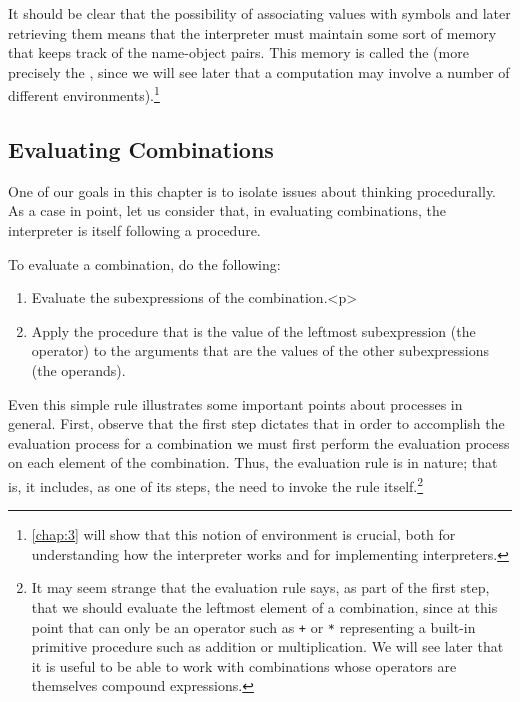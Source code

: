It should be clear that the possibility of associating values with
symbols and later retrieving them means that the interpreter must
maintain some sort of memory that keeps track of the name-object
pairs.  This memory is called the  (more precisely
the , since we will see later that a
computation may involve a number of different environments).\footnote{
  \ref{chap:3} will show that this notion of environment is crucial,
  both for understanding how the interpreter works and for
  implementing interpreters.}

\subsection{Evaluating Combinations}
\label{sec:1.1.3}

One of our goals in this chapter is to isolate issues about thinking
procedurally.  As a case in point, let us consider that, in evaluating
combinations, the interpreter is itself following a procedure.

To evaluate a combination, do the following:

\begin{enumerate}
\item Evaluate the subexpressions of the combination.<p>

\item Apply the procedure that is the value of the leftmost 
subexpression (the operator) to the arguments that are the values of
the other subexpressions (the operands).
\end{enumerate}

Even this simple rule illustrates some important points about
processes in general.  First, observe that the first step dictates
that in order to accomplish the evaluation process for a combination
we must first perform the evaluation process on each element of the
combination.  Thus, the evaluation rule is  in nature;
that is, it includes, as one of its steps, the need to invoke the rule
itself.\footnote{ It may seem strange that the evaluation rule says,
  as part of the first step, that we should evaluate the leftmost
  element of a combination, since at this point that can only be an
  operator such as \texttt{+} or \texttt{*} representing a built-in
  primitive procedure such as addition or multiplication.  We will see
  later that it is useful to be able to work with combinations whose
  operators are themselves compound expressions.}

